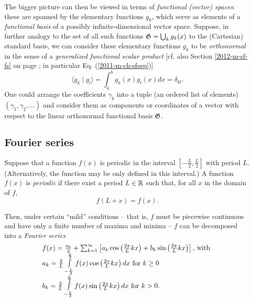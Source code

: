 The bigger picture can then be viewed in terms of
{\em functional (vector) spaces}: these are spanned by the elementary functions $g_k$, which serve as elements of a
{\em functional basis} of a possibly infinite-dimensional vector space.
Suppose, in further analogy to the set of all such functions ${\frak G}=\bigcup_k g_k(x)$
to the (Cartesian) standard basis, we can consider these elementary functions $g_k$ to be
{\em orthonormal} in the sense of a {\em generalized functional scalar product}
 [cf. also Section \ref{2012-m-sf-fs} on page \pageref{2012-m-sf-fs}; in particular
Eq. (\ref{2011-m-ch-sfesp})]
\begin{equation}
\langle   g_k \mid g_l\rangle
=
\int_{a}^b g_k(x)g_l(x)  dx =\delta_{kl}.
\label{2012-m-ch-sfesp1}
\end{equation}
One could arrange the coefficients $\gamma_k$ into a tuple (an ordered list of elements)
$(\gamma_1,\gamma_2, \ldots)$
and consider them as components or coordinates of a vector with respect to the
linear orthonormal functional basis ${\frak G}$.



\subsection{Fourier series}

Suppose that a function $f(x)$ is periodic in the interval $[-\frac{L}{2},\frac{L}{2}]$ with period $L$.
(Alternatively, the function may be only defined in this interval.)
A function $f(x)$
is {\em periodic}
if there exist a period $L\in {\Bbb R}$ such that, for all $x$ in the domain of $f$,
\begin{equation}
f(L+x)=f(x).
\end{equation}

Then, under certain ``mild'' conditions
-- that is, $f$ must be piecewise continuous and have only a finite number of maxima and minima --
$f$ can be decomposed into a {\em Fourier series}
\begin{equation}
\begin{array}{l}
f(x)={a_0\over2}+\sum_{k=1}^\infty
\left[a_k\cos\left(\frac{2\pi }{L}kx\right)+b_k\sin\left(\frac{2\pi }{L}kx\right)\right] \textrm{, with }\\
   a_k={2\over L}\int\limits_{-\frac{L}{2}}^\frac{L}{2}  f(x)\cos\left(\frac{2\pi }{L}kx\right) dx \textrm{ for } k \ge 0\\
   b_k={2\over L}\int\limits_{-\frac{L}{2}}^\frac{L}{2} f(x)\sin\left(\frac{2\pi }{L}kx\right) dx \textrm{ for } k > 0  .
\end{array}
\label{2012-m-ch-fs}
\end{equation}


